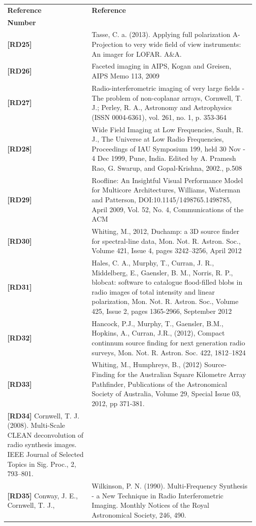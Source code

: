 \documentclass[11pt,a4paper]{article}
\begin{document}
 \begin{center}{
 \begin{tabularx}{\textwidth}{|l|X|}
     \hline
     \bf{Reference} & \bf{Reference}\\
     \bf{Number} & \\
     \hline
   {\bf [RD25]} & Tasse, C. a. (2013). Applying full polarization A-Projection to very wide field of view instruments: An imager for LOFAR. A\&A.\\
   {\bf [RD26]} & Faceted imaging in AIPS, Kogan and Greisen, AIPS Memo 113, 2009\\
   {\bf [RD27]} & Radio-interferometric imaging of very large fields - The
   problem of non-coplanar arrays, Cornwell, T. J.; Perley, R. A., Astronomy
   and Astrophysics (ISSN 0004-6361), vol. 261, no. 1, p. 353-364\\
    {\bf [RD28]} & Wide Field Imaging at Low Frequencies, Sault, R. J.,  The Universe at Low Radio Frequencies, Proceedings of IAU Symposium 199, held 30 Nov - 4 Dec 1999, Pune, India. Edited by A. Pramesh Rao, G. Swarup, and Gopal-Krishna, 2002., p.508\\
    {\bf [RD29]} & Roofline: An Insightful Visual Performance Model for
    Multicore Architectures, Williams, Waterman and Patterson,
    DOI:10.1145/1498765.1498785, April 2009, Vol. 52, No. 4, Communications of
    the ACM\\
    {\bf [RD30]} & Whiting, M., 2012, Duchamp: a 3D source finder for spectral-line data, Mon. Not. R. Astron. Soc., Volume 421, Issue 4,  pages 3242–3256, April 2012 \\
    {\bf [RD31]} & Hales, C. A., Murphy, T., Curran, J. R., Middelberg, E., Gaensler, B. M., Norris, R. P., blobcat: software to catalogue flood-filled blobs in radio images of total intensity and linear polarization, Mon. Not. R. Astron. Soc., Volume 425,  Issue 2, pages 1365-2966, September 2012\\
    {\bf [RD32]} & Hancock, P.J., Murphy, T., Gaensler, B.M., Hopkins, A.,
    Curran, J.R., (2012), Compact continnum source finding for next generation
    radio surveys, Mon. Not. R. Astron. Soc. 422, 1812–1824\\
   {\bf [RD33]} & Whiting, M.,  Humphreys, B., (2012) Source-Finding for the
   Australian Square Kilometre Array Pathfinder, Publications of the
   Astronomical Society of Australia, Volume 29, Special Issue 03, 2012,
   pp 371-381.\\
   {\bf [RD34]} Cornwell, T. J. (2008). Multi-Scale CLEAN deconvolution of radio synthesis images. IEEE Journal of Selected Topics in Sig. Proc., 2, 793–801.\\
   {\bf [RD35]} Conway, J. E., Cornwell, T. J., & Wilkinson, P. N. (1990). Multi-Frequency Synthesis - a New Technique in Radio Interferometric Imaging. Monthly Notices of the Royal Astronomical Society, 246, 490.\\
   
   \hline
 \end{tabularx}}
\end{center}
\end{document}
